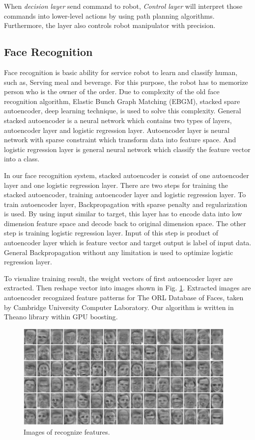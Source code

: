 \documentclass{llncs}
\begin{document}
When \textit{decision layer} send command to robot, \textit{Control layer} will interpret those commands into lower-level actions by using path planning algorithms. Furthermore, the layer also controls robot manipulator with precision.

\subsection{Face Recognition}

Face recognition is basic ability for service robot to learn and classify human, such as, Serving meal and beverage. For this purpose, the robot has to memorize person who is the owner of the order. Due to complexity of the old face recognition algorithm, Elastic Bunch Graph Matching (EBGM), stacked spare autoencoder, deep learning technique, is used to solve this complexity. General stacked autoencoder is a neural network which contains two types of layers, autoencoder layer and logistic regression layer. Autoencoder layer is neural network with sparse constraint which transform data into feature space. And logistic regression layer is general neural network which classify the feature vector into a class.

In our face recognition system, stacked autoencoder is consist of one autoencoder layer and one logistic regression layer. There are two steps for training the stacked autoencoder, training autoencoder layer and logistic regression layer. To train autoencoder layer, Backpropagation with sparse penalty and regularization is used. By using input similar to target, this layer has to encode data into low dimension feature space and decode back to original dimension space. The other step is training logistic regression layer. Input of this step is product of autoencoder layer which is feature vector and target output is label of input data. General Backpropagation without any limitation is used to optimize logistic regression layer.

To visualize training result, the weight vectors of first autoencoder layer are extracted. Then reshape vector into images shown in Fig. \ref{fig:rec_face}. Extracted images are autoencoder recognized feature patterns for The ORL Database of Faces, taken by Cambridge University Computer Laboratory. Our algorithm is written in Theano library within GPU boosting\cite{theano_c1}\cite{theano_c2}.

\begin{figure}
\centering
\includegraphics[height=5.2cm]{recognize_feature}
\caption{Images of recognize features.}
\label{fig:rec_face}
\end{figure} 
\end{document}
